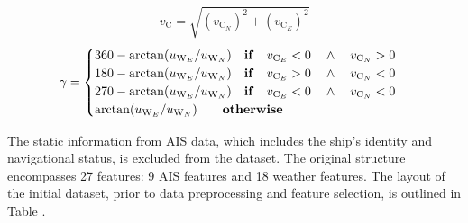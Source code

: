 \begin{equation}\label{eqn:vcurrabs}
    v_{\text{C}} = \sqrt{(v_{\text{C}_N})^2 + (v_{\text{C}_E})^2} 
\end{equation}
\begin{equation}\label{eqn:currdir}
    \gamma = 
    \begin{cases}
        360 - \arctan(u_{\text{W}_{E}} / u_{\text{W}_{N}}) \quad \text{\textbf{if}} \quad v_{\text{C}_E} < 0 \quad \wedge \quad v_{\text{C}_N} > 0 \\ 
        180 - \arctan(u_{\text{W}_{E}} / u_{\text{W}_{N}}) \quad \text{\textbf{if}} \quad v_{\text{C}_E} > 0 \quad \wedge \quad v_{\text{C}_N} < 0 \\ 
        270 - \arctan(u_{\text{W}_{E}} / u_{\text{W}_{N}}) \quad \text{\textbf{if}} \quad v_{\text{C}_E} < 0 \quad \wedge \quad v_{\text{C}_N} < 0 \\
        \arctan(u_{\text{W}_{E}} / u_{\text{W}_{N}}) \qquad \text{\textbf{otherwise}} 
    \end{cases}   
\end{equation}

The static information from AIS data, which includes the ship's identity and navigational status, is excluded from the dataset. The original structure encompasses 27 features: 9 AIS features and 18 weather features. The layout of the initial dataset, prior to data preprocessing and feature selection, is outlined in Table .

